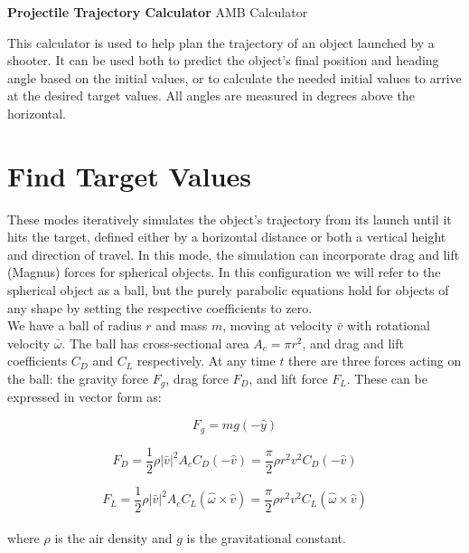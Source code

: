 \documentclass[a4paper]{article}
\begin{document}
	
	\Huge\textbf{Projectile Trajectory Calculator}
	\newline
	\LARGE AMB Calculator
	
	\vspace{0.5cm}
	\normalsize
	
	This calculator is used to help plan the trajectory of an object launched by a shooter. It can be used both to predict the object's final position and heading angle based on the initial values, or to calculate the needed initial values to arrive at the desired target values. All angles are measured in degrees above the horizontal.
	
	
	\section*{Find Target Values}
	
	These modes iteratively simulates the object's trajectory from its launch until it hits the target, defined either by a horizontal distance or both a vertical height and direction of travel. In this mode, the simulation can incorporate drag and lift (Magnus) forces for spherical objects. In this configuration we will refer to the spherical object as a ball, but the purely parabolic equations hold for objects of any shape by setting the respective coefficients to zero.\\
	
	We have a ball of radius $ r $ and mass $ m $, moving at velocity $ \bar{v} $ with rotational velocity $ \bar{\omega} $. The ball has cross-sectional area $ A_c = \pi r^2 $, and drag and lift coefficients $ C_D $ and $ C_L $ respectively. At any time $ t $ there are three forces acting on the ball: the gravity force $ F_g $, drag force $ F_D $, and lift force $ F_L $. These can be expressed in vector form as:
	
	\begin{equation}
		F_g = m g \left( - \hat{y} \right)
	\end{equation}
	
	\begin{equation}
		F_D = \frac{1}{2} \rho \left| \bar{v} \right|^2 A_c C_D \left( - \hat{v} \right)
		= \frac{\pi}{2} \rho r^2 v^2 C_D \left( -\hat{v} \right)
	\end{equation}
	
	\begin{equation}
		F_L = \frac{1}{2} \rho \left| \bar{v} \right|^2 A_c C_L \left( \hat{\omega} \times \hat{v} \right)
		= \frac{\pi}{2} \rho r^2 v^2 C_L \left( \hat{\omega} \times \hat{v} \right)
	\end{equation}
	\\
	where $ \rho $ is the air density and $ g $ is the gravitational constant.\\
	
\end{document}
